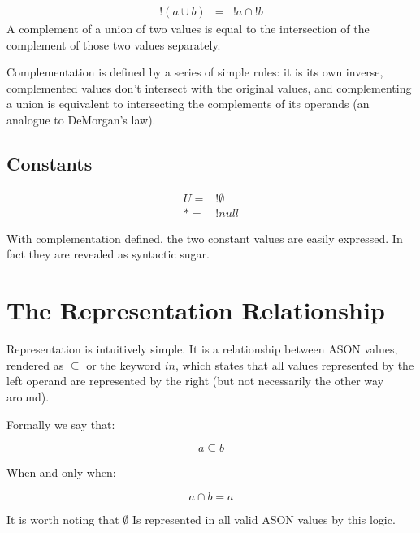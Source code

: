 \documentclass[letterpaper]{article}
\begin{document}
\begin{prule}
\label{sec:demorgan}
\begin{equation}
\begin{array}{rcl}
	! (a \cup b) &=& !a \cap !b
\end{array}
\end{equation}
A complement of a union of two values is equal to the intersection of the
complement of those two values separately.
\end{prule}

Complementation is defined by a series of simple rules: it is its own inverse,
complemented values don't intersect with the original values, and complementing
a union is equivalent to intersecting the complements of its operands (an
analogue to DeMorgan's law).

\subsection{Constants}
\begin{equation}
\begin{split}
U = &!\emptyset \\
* = &!null
\end{split}
\end{equation}

With complementation defined, the two constant values are easily expressed. In
fact they are revealed as syntactic sugar.

\section{The Representation Relationship}
\label{sec:representation}
Representation is intuitively simple. It is a relationship between ASON values,
rendered as \(\subseteq\) or the keyword \(in\), which states that all
values represented by the left operand are represented by the right (but not
necessarily the other way around).

Formally we say that:

\begin{equation}
a \subseteq b
\end{equation}

When and only when:

\begin{equation}
a \cap b = a
\end{equation}

It is worth noting that \(\emptyset\) Is represented in all valid ASON values
by this logic.
\end{document}
